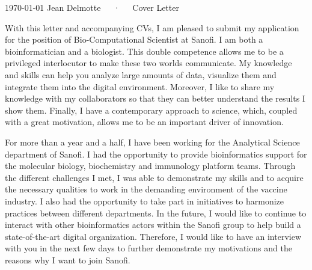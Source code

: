 \documentclass[11pt, a4paper]{awesome-cv}
\begin{document}
\makecvheader[L]

\makecvfooter
  {\today}
  {Jean Delmotte~~~·~~~Cover Letter}
  {\thepage}
\makelettertitle

\begin{cvletter}

With this letter and accompanying CVs, I am pleased to submit my application for the position of Bio-Computational Scientist at Sanofi.
I am both a bioinformatician and a biologist. This double competence allows me to be a privileged interlocutor to make these two worlds communicate. My knowledge and skills can help you analyze large amounts of data, visualize them and integrate them into the digital environment. Moreover, I like to share my knowledge with my collaborators so that they can better understand the results I show them. Finally, I have a contemporary approach to science, which, coupled with a great motivation, allows me to be an important driver of innovation.

For more than a year and a half, I have been working for the Analytical Science department of Sanofi. I had the opportunity to provide bioinformatics support for the molecular biology, biochemistry and immunology platform teams. Through the different challenges I met, I was able to demonstrate my skills and to acquire the necessary qualities to work in the demanding environment of the vaccine industry. I also had the opportunity to take part in initiatives to harmonize practices between different departments. In the future, I would like to continue to interact with other bioinformatics actors within the Sanofi group to help build a state-of-the-art digital organization. Therefore, I would like to have an interview with you in the next few days to further demonstrate my motivations and the reasons why I want to join Sanofi.



\end{cvletter}
\end{document}
